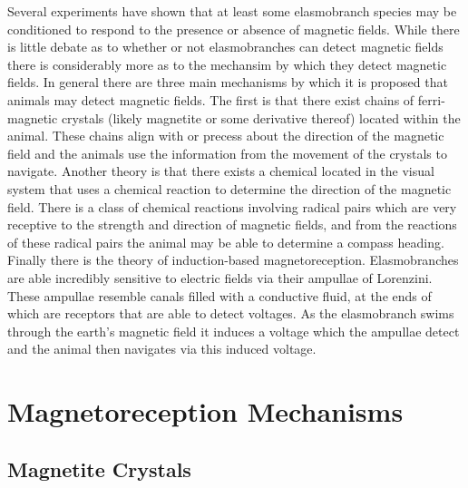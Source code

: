\documentclass[12pt]{article}
\begin{document}
Several experiments have shown that at least some elasmobranch species may be conditioned to respond to the presence or absence of magnetic fields\cite{Kalmijn:1982}\cite{Hodson:2000}\cite{Walker:2003}. While there is little debate as to whether or not elasmobranches can detect magnetic fields there is considerably more as to the mechansim by which they detect magnetic fields. In general there are three main mechanisms by which it is proposed that animals may detect magnetic fields\cite{Johnsen:2008}. The first is that there exist chains of ferri-magnetic crystals (likely magnetite or some derivative thereof) located within the animal. These chains align with or precess about the direction of the magnetic field and the animals use the information from the movement of the crystals to navigate. Another theory is that there exists a chemical located in the visual system that uses a chemical reaction to determine the direction of the magnetic field. There is a class of chemical reactions involving radical pairs which are very receptive to the strength and direction of magnetic fields\cite{Grissom:1995}\cite{Ritz:2004}, and from the reactions of these radical pairs the animal may be able to determine a compass heading\cite{Johnsen:2008}\cite{Ritz:2000}. Finally there is the theory of induction-based magnetoreception\cite{Paulin:1995}\cite{Kalmijn:1982}. Elasmobranches are able incredibly sensitive to electric fields via their ampullae of Lorenzini. These ampullae resemble canals filled with a conductive fluid, at the ends of which are receptors that are able to detect voltages. As the elasmobranch swims through the earth's magnetic field it induces a voltage which the ampullae detect and the animal then navigates via this induced voltage.

\section{Magnetoreception Mechanisms}
\subsection{Magnetite Crystals}
\end{document}
